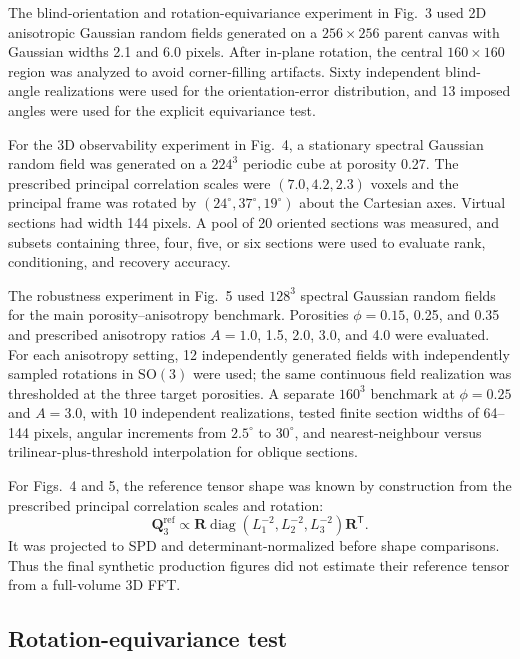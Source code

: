 \documentclass{article}
\begin{document}
The blind-orientation and rotation-equivariance experiment in Fig.~3 used
2D anisotropic Gaussian random fields generated on a $256\times256$ parent
canvas with Gaussian widths 2.1 and 6.0 pixels. After in-plane rotation, the
central $160\times160$ region was analyzed to avoid corner-filling artifacts.
Sixty independent blind-angle realizations were used for the orientation-error
distribution, and 13 imposed angles were used for the explicit equivariance
test.

For the 3D observability experiment in Fig.~4, a stationary spectral Gaussian
random field was generated on a $224^3$ periodic cube at porosity 0.27. The
prescribed principal correlation scales were $(7.0,4.2,2.3)$ voxels and the
principal frame was rotated by $(24^{\circ},37^{\circ},19^{\circ})$ about the
Cartesian axes. Virtual sections had width 144 pixels. A pool of 20 oriented
sections was measured, and subsets containing three, four, five, or six
sections were used to evaluate rank, conditioning, and recovery accuracy.

The robustness experiment in Fig.~5 used $128^3$ spectral Gaussian random
fields for the main porosity--anisotropy benchmark. Porosities
$\phi=0.15$, 0.25, and 0.35 and prescribed anisotropy ratios
$A=1.0$, 1.5, 2.0, 3.0, and 4.0 were evaluated. For each anisotropy setting,
12 independently generated fields with independently sampled rotations in
$\mathrm{SO}(3)$ were used; the same continuous field realization was
thresholded at the three target porosities. A separate $160^3$ benchmark at
$\phi=0.25$ and $A=3.0$, with 10 independent realizations, tested finite
section widths of 64--144 pixels, angular increments from $2.5^{\circ}$ to
$30^{\circ}$, and nearest-neighbour versus trilinear-plus-threshold
interpolation for oblique sections.

For Figs.~4 and 5, the reference tensor shape was known by construction from
the prescribed principal correlation scales and rotation:
\begin{equation}
    \bm{Q}_{3}^{\mathrm{ref}}
    \propto
    \bm{R}
    \operatorname{diag}
    \left(
        L_1^{-2},L_2^{-2},L_3^{-2}
    \right)
    \bm{R}^{\mathsf T}.
\end{equation}
It was projected to SPD and determinant-normalized before shape comparisons.
Thus the final synthetic production figures did not estimate their reference
tensor from a full-volume 3D FFT.

\subsection{Rotation-equivariance test}
\label{subsec:rotation_equivariance}
\end{document}
